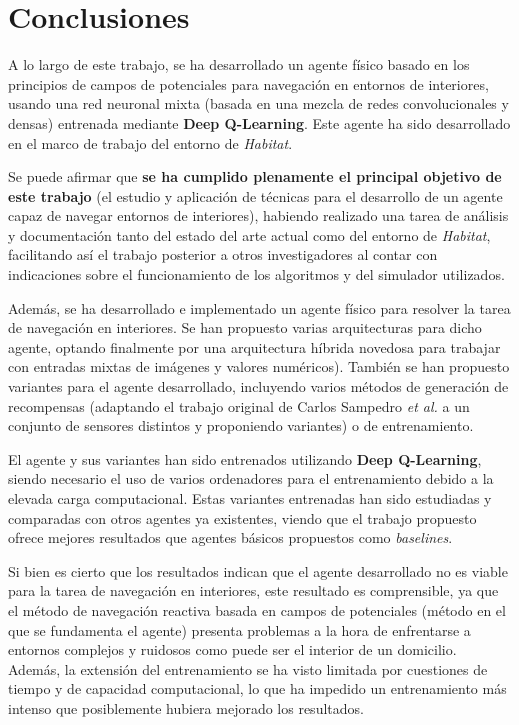 \chapter{Conclusiones}

A lo largo de este trabajo, se ha desarrollado un agente físico basado en los principios de campos de potenciales para navegación en entornos de interiores, usando una red neuronal mixta (basada en una mezcla de redes convolucionales y densas) entrenada mediante \textbf{Deep Q-Learning}. Este agente ha sido desarrollado en el marco de trabajo del entorno de \textit{Habitat}.

Se puede afirmar que \textbf{se ha cumplido plenamente el principal objetivo de este trabajo} (el estudio y aplicación de técnicas para el desarrollo de un agente capaz de navegar entornos de interiores), habiendo realizado una tarea de análisis y documentación tanto del estado del arte actual como del entorno de \textit{Habitat}, facilitando así el trabajo posterior a otros investigadores al contar con indicaciones sobre el funcionamiento de los algoritmos y del simulador utilizados.

Además, se ha desarrollado e implementado un agente físico para resolver la tarea de navegación en interiores. Se han propuesto varias arquitecturas para dicho agente, optando finalmente por una arquitectura híbrida novedosa para trabajar con entradas mixtas de imágenes y valores numéricos). También se han propuesto variantes para el agente desarrollado, incluyendo varios métodos de generación de recompensas (adaptando el trabajo original de Carlos Sampedro \textit{et al.} \cite{Sampedro2018} a un conjunto de sensores distintos y proponiendo variantes) o de entrenamiento.

El agente y sus variantes han sido entrenados utilizando \textbf{Deep Q-Learning}, siendo necesario el uso de varios ordenadores para el entrenamiento debido a la elevada carga computacional. Estas variantes entrenadas han sido estudiadas y comparadas con otros agentes ya existentes, viendo que el trabajo propuesto ofrece mejores resultados que agentes básicos propuestos como \textit{baselines}.

Si bien es cierto que los resultados indican que el agente desarrollado no es viable para la tarea de navegación en interiores, este resultado es comprensible, ya que el método de navegación reactiva basada en campos de potenciales (método en el que se fundamenta el agente) presenta problemas a la hora de enfrentarse a entornos complejos y ruidosos como puede ser el interior de un domicilio. Además, la extensión del entrenamiento se ha visto limitada por cuestiones de tiempo y de capacidad computacional, lo que ha impedido un entrenamiento más intenso que posiblemente hubiera mejorado los resultados.


